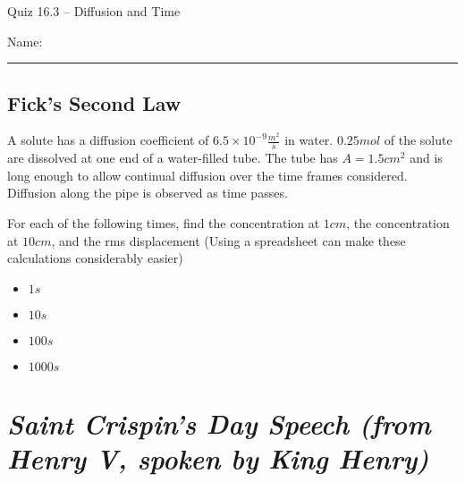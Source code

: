 \documentclass[11pt, letterpaper]{memoir}
\begin{document}
	\begin{center}
		{\large Quiz 16.3 -- Diffusion and Time}
	\end{center}
	{\large Name: \rule[-1mm]{4in}{.1pt} 


\subsection*{Fick's Second Law}
A solute has a diffusion coefficient of $6.5\times10^{-9}\frac{m^2}{s}$ in water. $0.25 mol$ of the solute are dissolved at one end of a water-filled tube. The tube has $A=1.5 cm^2$ and is long enough to allow continual diffusion over the time frames considered. Diffusion along the pipe is observed as time passes.

\noindent For each of the following times, find the concentration at $1cm$, the concentration at $10cm$, and the rms displacement (Using a spreadsheet can make these calculations considerably easier)
\begin{itemize}
	\item $1s$
	
	\vspace{8em}
	\item $10s$
	
	\vspace{8em}
	\item $100s$
	
	\vspace{8em}
	\item $1000s$
\end{itemize}
\newpage
\pagestyle{empty}
\addtocounter{page}{-1}	
\section*{\emph{Saint Crispin's Day Speech (from \emph{Henry V}, spoken by King Henry)}}
}
\end{document}
